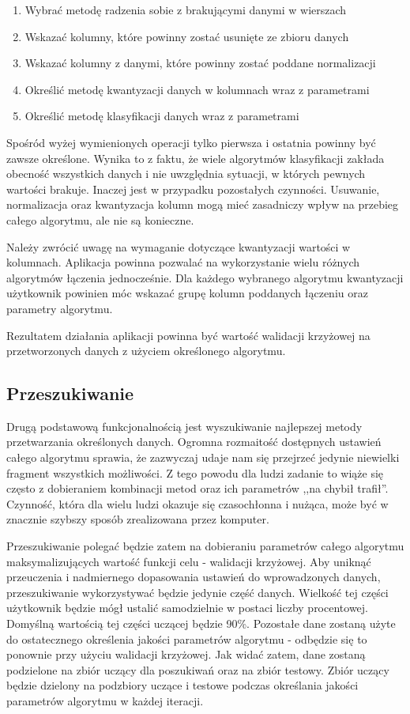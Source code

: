 \documentclass[../thesis.tex]{subfiles}
\begin{document}
\begin{enumerate}
	\item Wybrać metodę radzenia sobie z brakującymi danymi w wierszach
	\item Wskazać kolumny, które powinny zostać usunięte ze zbioru danych
	\item Wskazać kolumny z danymi, które powinny zostać poddane normalizacji
	\item Określić metodę kwantyzacji danych w kolumnach wraz z parametrami
	\item Określić metodę klasyfikacji danych wraz z parametrami
\end{enumerate}

Spośród wyżej wymienionych operacji tylko pierwsza i ostatnia powinny być zawsze określone. Wynika to z faktu, że wiele algorytmów klasyfikacji zakłada obecność wszystkich danych i nie uwzględnia sytuacji, w których pewnych wartości brakuje. Inaczej jest w przypadku pozostałych czynności. Usuwanie, normalizacja oraz kwantyzacja kolumn mogą mieć zasadniczy wpływ na przebieg całego algorytmu, ale nie są konieczne.

Należy zwrócić uwagę na wymaganie dotyczące kwantyzacji wartości w kolumnach. Aplikacja powinna pozwalać na wykorzystanie wielu różnych algorytmów łączenia jednocześnie. Dla każdego wybranego algorytmu kwantyzacji użytkownik powinien móc wskazać grupę kolumn poddanych łączeniu oraz parametry algorytmu.

Rezultatem działania aplikacji powinna być wartość walidacji krzyżowej na przetworzonych danych z użyciem określonego algorytmu.

\subsection{Przeszukiwanie}
\label{req:sec_search}

Drugą podstawową funkcjonalnością jest wyszukiwanie najlepszej metody przetwarzania określonych danych. Ogromna rozmaitość dostępnych ustawień całego algorytmu sprawia, że zazwyczaj udaje nam się przejrzeć jedynie niewielki fragment wszystkich możliwości. Z tego powodu dla ludzi zadanie to wiąże się często z dobieraniem kombinacji metod oraz ich parametrów ,,na chybił trafił''. Czynność, która dla wielu ludzi okazuje się czasochłonna i nużąca, może być w znacznie szybszy sposób zrealizowana przez komputer.

Przeszukiwanie polegać będzie zatem na dobieraniu parametrów całego algorytmu maksymalizujących wartość funkcji celu - walidacji krzyżowej. Aby uniknąć przeuczenia i nadmiernego dopasowania ustawień do wprowadzonych danych, przeszukiwanie wykorzystywać będzie jedynie część danych. Wielkość tej części użytkownik będzie mógł ustalić samodzielnie w postaci liczby procentowej. Domyślną wartością tej części uczącej będzie 90\%. Pozostałe dane zostaną użyte do ostatecznego określenia jakości parametrów algorytmu - odbędzie się to ponownie przy użyciu walidacji krzyżowej. Jak widać zatem, dane zostaną podzielone na zbiór uczący dla poszukiwań oraz na zbiór testowy. Zbiór uczący będzie dzielony na podzbiory uczące i testowe podczas określania jakości parametrów algorytmu w każdej iteracji. 
\end{document}
